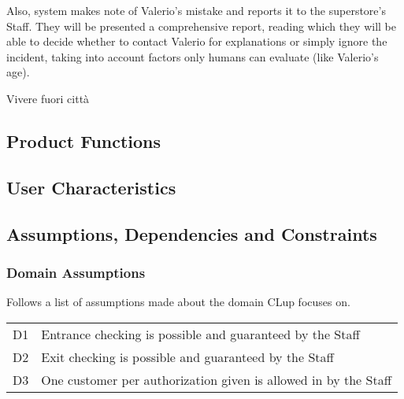Also, system makes note of Valerio's mistake and reports it to the superstore's Staff. They will be presented a comprehensive report, reading which they will be able to decide whether to contact Valerio for explanations or simply ignore the incident, taking into account factors only humans can evaluate (like Valerio's age).\newline

Vivere fuori citt\`a

\subsection{Product Functions}

\subsection{User Characteristics}

\subsection{Assumptions, Dependencies and Constraints}
\subsubsection{Domain Assumptions}
Follows a list of assumptions made about the domain CLup focuses on.\newline\newline
\begin{tabular}{l|l}
	D1 & Entrance checking is possible and guaranteed by the Staff\\
	D2 & Exit checking is possible and guaranteed by the Staff\\
	D3 & One customer per authorization given is allowed in by the Staff\\
	
\end{tabular}
